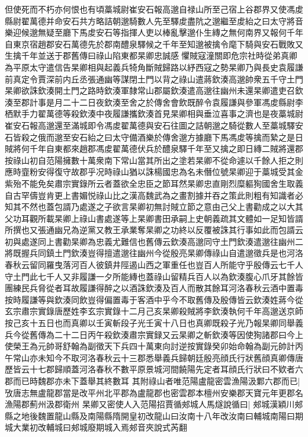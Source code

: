 {但使死而不朽亦何恨也有頃藁城尉崔安石報高邈自禄山所至己宿上谷郡界又使馮䖍縣尉翟萬德并命安石共方略詰朝邈騎數人先至驛䖍盡阬之邈繼至䖍紿之曰太守將音樂迎候邈無疑至廳下馬䖍安石等指揮人吏以棒亂擊邈仆生縳之無何南界又報何千年自東京宿趙郡安石萬德先於郡南醴泉驛候之千年至知邈被擒令麾下騎與安石戰敗又生擒千年並送于郡舊傳曰祿山陷東都杲卿忠誠感懼賊寇潼關即危宗社時從弟真卿為平原太守遣信告杲卿相與起義兵犄角斷賊歸路以紓西寇之勢杲卿乃與長史袁履謙前真定令賈深前内丘丞張通幽等謀閉土門以背之祿山遣蔣欽湊高邈帥衆五千守土門杲卿欲誅欽湊開土門之路時欽湊軍隸常山郡屬欽湊遣高邈往幽州未還杲卿遣吏召欽湊至郡計事是月二十二日夜欽湊至舍之於傳舍會飲既醉令袁履謙與參軍馮䖍縣尉李栖默手力翟萬德等殺欽湊中夜履謙攜欽湊首見杲卿相與垂泣喜事之濟也是夜藁城尉崔安石報高邈還至滿城即令馮䖍翟萬德與安石往圖之詰朝邈之騎從數人至藁城驛安石皆殺之俄而邈至安石紿之曰太守備酒樂於傳舍邈方據廳下馬馮䖍等擒而縶之是日賊將何千年自東都來趙郡馮䖍翟萬德伏兵於醴泉驛千年至又擒之即日縳二賊將還郡按祿山初自范陽擁數十萬衆南下常山當其所出之塗若杲卿不從命遽以千餘人拒之則應時韲粉安得復守故郡乎况時祿山猶以誅楊國忠為名未僭位號杲卿迎于藁城受其金紫殆不能免矣肅宗實錄所云者蓋欲全忠臣之節耳然杲卿忠直剛烈糜軀狥國舍生取義自古罕儔豈肯更上書媚悦祿山比之漢高魏武為之畫割據并吞之策此則粗有知識者必知其不然也蓋包諝乃處遂之子欲言杲卿初無討賊立節之意由己父上書勸成之以大其父功耳觀所載杲卿上祿山書處遂等上杲卿書田承嗣上史朝義疏其文體如一足知皆諝所撰也又張通幽兄為逆黨又教王承業奪杲卿之功終以反覆被誅其行事如此而包諝云初與處遂同上書勸杲卿為忠義尤難信也舊傳云欽湊高邈同守土門欽湊遣邈往幽州二將既握兵同鎮土門欽湊豈得擅遣邈往幽州今從殷亮杲卿傳祿山自遣邈徵兵是也河洛春秋云留同羅曳落河百人彼鎮井陘遏山西之軍重任也豈百人所能守乎殷傳云七千人守土門此七千人又非履謙一夕所能縳也蓋祿山留精兵百人以為欽湊腹心爪牙其餘皆團練民兵脅從者耳故履謙得醉之以酒誅欽湊及百人而散其餘耳河洛春秋云酒中置毒按時履謙等與欽湊同飲豈得偏置毒于客酒中乎今不取舊傳及殷傳皆云欽湊姓蔣今從玄宗肅宗實錄唐歷姓李玄宗實錄十二月己亥杲卿殺賊將李欽湊執何千年高邈送京師按己亥十五日也而真卿以壬寅斬段子光壬寅十八日也真卿既殺子光乃報杲卿同舉義兵今從舊傳為二十二日丙午殺欽湊肅宗實録又云杲卿之斬欽湊等因使狥諸郡曰今上使榮王為元帥哥舒翰為副徵天下兵四十萬東向討逆按實錄癸卯始命翰為副元帥計丙午常山亦未知今不取河洛春秋云十三郡悉舉義兵歸朝廷殷亮顔氏行狀舊顔真卿傳唐歷皆云十七郡歸順蓋河洛春秋不數平原景城河間饒陽先定者耳顔氏行狀曰不欵者六郡而已時魏郡亦未下蓋舉其終數耳}
其附祿山者唯范陽盧龍密雲漁陽汲鄴六郡而已|{
	攷唐志無盧龍郡當是改平州北平郡為盧龍郡也密雲郡本檀州安樂郡天寶元年更郡名漁陽郡薊州汲郡衛州}
杲卿又密使人入范陽招賈循郟城人馬燧說循曰|{
	郟城漢穎川郟縣之地後魏置龍山縣及南陽縣隋開皇初改龍山曰汝南十八年改汝南曰輔城南陽曰期城大業初改輔城曰郟城廢期城入焉郟音夾說式芮翻}

